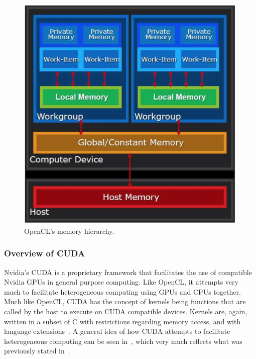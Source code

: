 \documentclass[a4paper,11pt]{article}
\begin{document}
\begin{figure}[ht]
  \centering
  \includegraphics[scale=0.5]{img/opencl-mem-model}
  \caption{OpenCL's memory hierarchy.~\cite{slides:KhronosOpenCLOverview}}
\label{fig:opencl-mem-model}
\end{figure}

\subsubsection{Overview of CUDA} %
\label{ssub:overview_of_cuda}
Nvidia's CUDA is a proprietary framework that facilitates the use of compatible Nvidia GPUs in general purpose computing.
Like OpenCL, it attempts very much to facilitate heterogeneous computing using GPUs and CPUs together. Much like OpenCL,
CUDA has the concept of kernels being functions that are called by the host to execute on CUDA compatible devices. Kernels
are, again, written in a subset of C with restrictions regarding memory access, and with language extensions~\cite{slides:KhronosOpenCLOverview}. A general
idea of how CUDA attempts to facilitate heterogeneous computing can be seen in~, which very much
reflects what was previously stated in~.
\end{document}
